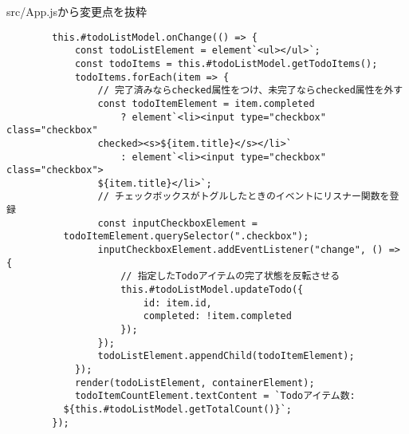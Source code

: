 \begin{listtitle}
src/App.jsから変更点を抜粋
\end{listtitle}
\begin{lstlisting}
        this.#todoListModel.onChange(() => {
            const todoListElement = element`<ul></ul>`;
            const todoItems = this.#todoListModel.getTodoItems();
            todoItems.forEach(item => {
                // 完了済みならchecked属性をつけ、未完了ならchecked属性を外す
                const todoItemElement = item.completed
                    ? element`<li><input type="checkbox" class="checkbox"
		        checked><s>${item.title}</s></li>`
                    : element`<li><input type="checkbox" class="checkbox">
		        ${item.title}</li>`;
                // チェックボックスがトグルしたときのイベントにリスナー関数を登録
                const inputCheckboxElement =
		  todoItemElement.querySelector(".checkbox");
                inputCheckboxElement.addEventListener("change", () => {
                    // 指定したTodoアイテムの完了状態を反転させる
                    this.#todoListModel.updateTodo({
                        id: item.id,
                        completed: !item.completed
                    });
                });
                todoListElement.appendChild(todoItemElement);
            });
            render(todoListElement, containerElement);
            todoItemCountElement.textContent = `Todoアイテム数:
	      ${this.#todoListModel.getTotalCount()}`;
        });
\end{lstlisting}
\listend
